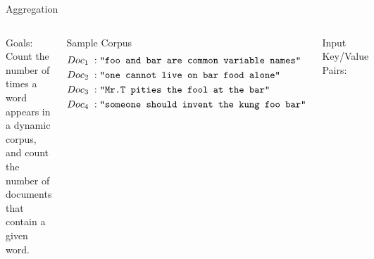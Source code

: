 \documentclass[t,landscape]{beamer}
\begin{document}
\begin{frame}{Aggregation}
\begin{columns}

\scriptsize
Goals: Count the number of times a word appears in a dynamic corpus, and count the number of documents that contain a given word.


\begin{block}{Sample Corpus}
\begin{align*}
Doc_1\;:&\;\texttt{"foo and bar are common variable names"}\\
Doc_2\;:&\;\texttt{"one cannot live on bar food alone"}\\
Doc_3\;:&\;\texttt{"Mr.\noindent T pities the fool at the bar"}\\
Doc_4\;:&\;\texttt{"someone should invent the kung foo bar"}
\end{align*}
\end{block}

\begin{block}{ \tiny Input Key/Value Pairs:}
\begin{center}
\end{center}
\end{block}
\end{columns}
\end{frame}
\end{document}
